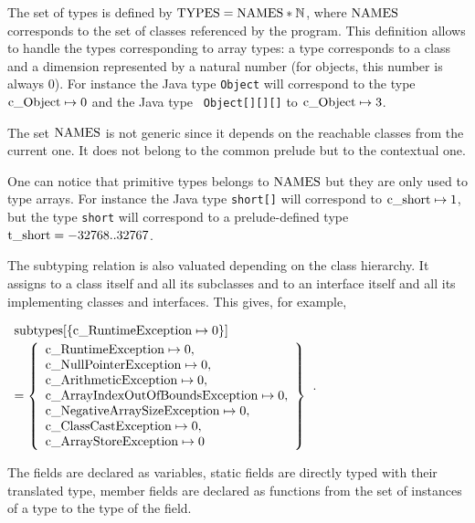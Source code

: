  The set of types is defined by $\rm{TYPES} = \rm{NAMES} * \mathbb{N}$, where $\rm{NAMES}$ corresponds to the set of
classes referenced by the program.
 This definition allows to handle the types corresponding to array types: a type corresponds to a class and a
dimension represented by a natural number (for objects, this number is always 0). For instance the Java type
{\tt \rm{Object}} will correspond to the type $\rm{c\_Object} \mapsto 0$ and the Java type {\tt
\rm{Object}[][][]} to $\rm{c\_Object} \mapsto 3$.

 The set $\rm{NAMES}$ is not generic since it depends on the reachable classes from the current one.
 It does not belong to the common prelude but to the contextual one.

 One can notice that primitive types belongs to $\rm{NAMES}$ but they are only used to type arrays. For
instance the Java type {\tt short[]} will correspond to $\rm{c\_short} \mapsto 1$, but the type {\tt short} will
correspond to a prelude-defined type $\rm{t\_short} = -32768..32767$.

The subtyping relation is also valuated depending on the class hierarchy. It assigns to a class itself and all
its subclasses and to an interface itself and all its implementing classes and interfaces.
 This gives, for example,
\begin{center}
$\begin{array}{l}
\rm{subtypes}[\{\rm{c\_RuntimeException} \mapsto 0\}] \\[1 mm]
 = \left\{ \begin{array}{l} \rm{c\_RuntimeException} \mapsto 0,  \\
\rm{c\_NullPointerException} \mapsto 0 , \\ \rm{c\_ArithmeticException} \mapsto 0,   \\
\rm{c\_ArrayIndexOutOfBoundsException} \mapsto 0, \\
\rm{c\_NegativeArraySizeException} \mapsto 0, \\ \rm{c\_ClassCastException} \mapsto 0 , \\
\rm{c\_ArrayStoreException}  \mapsto 0
 \end{array} \right\}
\end{array}$.
\end{center}

 The fields are declared as variables, static fields are directly typed with their translated type,
 member fields are declared as functions from the set of instances of a type to the type of the field.

